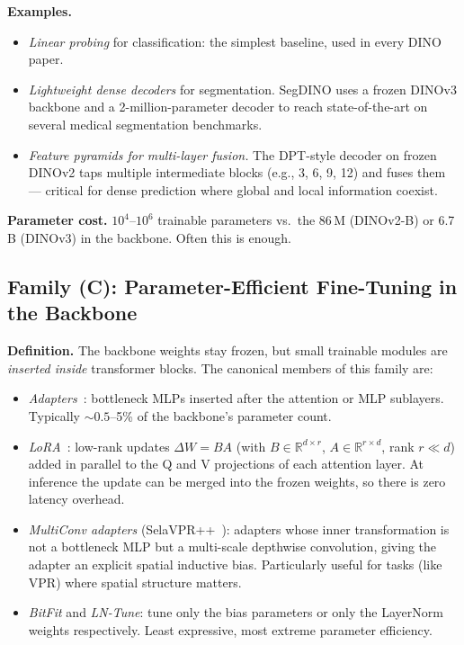 \documentclass[11pt,a4paper]{article}
\begin{document}
\textbf{Examples.}
\begin{itemize}[leftmargin=*]
  \item \emph{Linear probing} for classification: the simplest baseline,
  used in every DINO paper.
  \item \emph{Lightweight dense decoders} for segmentation. SegDINO uses
  a frozen DINOv3 backbone and a 2-million-parameter decoder to reach
  state-of-the-art on several medical segmentation benchmarks.
  \item \emph{Feature pyramids for multi-layer fusion.} The DPT-style
  decoder on frozen DINOv2 taps multiple intermediate blocks (e.g., 3, 6,
  9, 12) and fuses them --- critical for dense prediction where global
  and local information coexist.
\end{itemize}

\textbf{Parameter cost.} $10^4$--$10^6$ trainable parameters vs.\ the
86\,M (DINOv2-B) or 6.7\,B (DINOv3) in the backbone. Often this is
enough.

\subsection{Family (C): Parameter-Efficient Fine-Tuning in the Backbone}

\textbf{Definition.} The backbone weights stay frozen, but small trainable
modules are \emph{inserted inside} transformer blocks. The canonical
members of this family are:

\begin{itemize}[leftmargin=*]
  \item \emph{Adapters}~\citep{houlsby2019parameter}: bottleneck MLPs
  inserted after the attention or MLP sublayers. Typically
  $\sim 0.5$--5\% of the backbone's parameter count.
  \item \emph{LoRA}~\citep{hu2022lora}: low-rank updates
  $\Delta W = B A$ (with $B \in \mathbb{R}^{d \times r}$,
  $A \in \mathbb{R}^{r \times d}$, rank $r \ll d$) added in parallel to
  the Q and V projections of each attention layer. At inference the
  update can be merged into the frozen weights, so there is zero
  latency overhead.
  \item \emph{MultiConv adapters} (SelaVPR++~\citep{lu2025selavprpp}):
  adapters whose inner transformation is not a bottleneck MLP but a
  multi-scale depthwise convolution, giving the adapter an explicit
  spatial inductive bias. Particularly useful for tasks (like VPR)
  where spatial structure matters.
  \item \emph{BitFit} and \emph{LN-Tune}: tune only the bias
  parameters or only the LayerNorm weights respectively. Least
  expressive, most extreme parameter efficiency.
\end{itemize}
\end{document}
